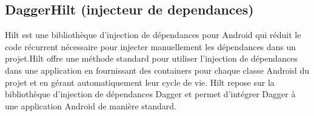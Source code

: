 \subsection{DaggerHilt (injecteur de dependances)}
Hilt est une bibliothèque d'injection de dépendances pour Android\cite{androidInjectionDpendances} qui réduit le code récurrent nécessaire pour injecter manuellement les dépendances dans un projet.Hilt offre une méthode standard pour utiliser l'injection de dépendances dans une application en fournissant des containers pour chaque classe Android du projet et en gérant automatiquement leur cycle de vie. 
Hilt repose sur la bibliothèque d'injection de dépendances Dagger et permet d'intégrer Dagger à une application Android de manière standard.


